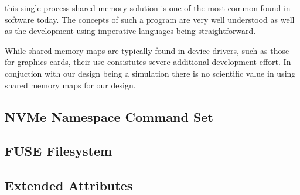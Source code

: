 this single process shared memory solution is one of the most common found in
software today. The concepts of such a program are very well understood as
well as the development using imperative languages being straightforward.

While shared memory maps are typically found in device drivers, such as those
for graphics cards, their use consistutes severe additional development effort.
In conjuction with our design being a simulation there is no scientific value in
using shared memory maps for our design.

\subsection{NVMe Namespace Command Set}

\subsection{FUSE Filesystem}

\subsection{Extended Attributes}

